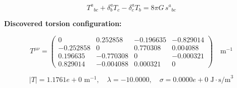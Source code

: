 
\begin{equation}
  T^a{}_{bc} + \delta^a_b T_c - \delta^a_c T_b = 8\pi G \, s^a{}_{bc}
\end{equation}

\textbf{Discovered torsion configuration:}

\begin{equation}
  T^{\mu\nu} = \begin{pmatrix}
    0 & 0.252858 & -0.196635 & -0.829014 \\
    -0.252858 & 0 & 0.770308 & 0.004088 \\
    0.196635 & -0.770308 & 0 & -0.000321 \\
    0.829014 & -0.004088 & 0.000321 & 0
  \end{pmatrix} \quad \text{m}^{-1}
\end{equation}

\begin{equation}
  |T| = 1.1761e+0 \text{ m}^{-1}, \quad
  \lambda = -10.0000, \quad
  \sigma = 0.0000e+0 \text{ J}\cdot\text{s/m}^3
\end{equation}